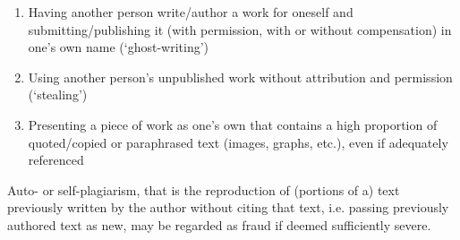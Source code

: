 \documentclass[conference,compsoc]{IEEEtran}
\begin{document}
\begin{itemize}
\begin{enumerate}
  \item Having another person write/author a work for oneself and submitting/publishing it (with permission, with or without compensation) in one’s own name (‘ghost-writing’)
  \item Using another person’s unpublished work without attribution and permission (‘stealing’)
  \item Presenting a piece of work as one’s own that contains a high proportion of quoted/copied or paraphrased text (images, graphs, etc.), even if adequately referenced
\end{enumerate}
Auto- or self-plagiarism, that is the reproduction of (portions of a) text previously written by the author without citing that text, i.e. passing previously authored text as new, may be regarded as fraud if deemed sufficiently severe.
\end{itemize}
\end{document}
